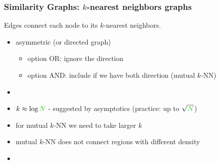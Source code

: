 \documentclass{beamer}
\begin{document}
\begin{frame}
\frametitle{Similarity Graphs: $k$-nearest neighbors  graphs}
\begin{block}{}
Edges connect each node to its $k$-nearest neighbors.
\end{block}
\pause
\begin{itemize}\addtolength{\itemsep}{0.4\baselineskip}
\item asymmetric (or directed graph) 
\begin{itemize}
\item option OR: ignore the direction
\item option AND: include if we have both direction (mutual $k$-NN)  
\end{itemize}
\item {} 
\item $k \approx \log \nodes$ - suggested by asymptotics (practice: up to $\sqrt{\nodes}$)
\item for mutual $k$-NN we need to take larger $k$
\item mutual $k$-NN does not connect regions with different density 
\item {}
\end{itemize}
\end{frame}
\end{document}
